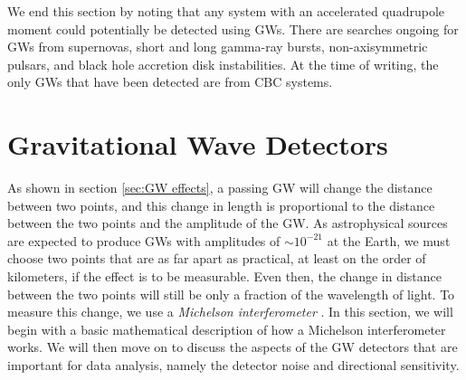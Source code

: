 \documentclass[11pt]{cuthesis}
\begin{document}
We end this section by noting that any system with an accelerated quadrupole moment could potentially be detected using GWs. There are searches ongoing for GWs from supernovas, short and long gamma-ray bursts, non-axisymmetric pulsars, and black hole accretion disk instabilities. At the time of writing, the only GWs that have been detected are from CBC systems.  

\section{Gravitational Wave Detectors} \label{sec:gw detectors}
As shown in section \ref{sec:GW effects}, a passing GW will change the distance between two points, and this change in length is proportional to the distance between the two points and the amplitude of the GW. As astrophysical sources are expected to produce GWs with amplitudes of $\sim 10^{-21}$ at the Earth, we must choose two points that are as far apart as practical, at least on the order of kilometers, if the effect is to be measurable. Even then, the change in distance between the two points will still be only a fraction of the wavelength of light. To measure this change, we use a \textit{Michelson interferometer} \cite{weiss72}. In this section, we will begin with a basic mathematical description of how a Michelson interferometer works. We will then move on to discuss the aspects of the GW detectors that are important for data analysis, namely the detector noise and directional sensitivity.
\end{document}
